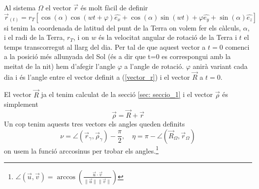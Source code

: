 \documentclass[11pt]{article}
\begin{document}
Al sistema $\Omega$ el vector $\vec{r}$ és molt fàcil de definir 
\begin{equation}
    \vec{r}_{(t)}=r_T[\cos(\alpha)\cos(wt+\varphi)\hat{e_x}+\cos(\alpha)\sin(wt)+\varphi\hat{e_y}+\sin(\alpha)\hat{e_z}]
    \label{vector_r}
\end{equation}
si tenim la coordenada de latitud del punt de la Terra on volem fer els càlculs, $\alpha$, i el radi de la Terra, $r_T$, i on $w$ és la velocitat angular de rotació de la Terra i $t$ el temps transcorregut al llarg del dia.
Per tal de que aquest vector a $t=0$ comenci a la posició més allunyada del Sol (és a dir que t=0 es correspongui amb la meitat de la nit) hem d'afegir l'angle $\varphi$ a l'angle de rotació. $\varphi$ anirà variant cada dia i és l'angle entre el vector definit a (\ref{vector_r}) i el vector $\vec{R}$ a $t=0$.

El vector $\vec{R}$ ja el tenim calculat de la secció \ref{sec: seccio_1} i el vector $\vec{\rho}$ és simplement
\begin{equation}
    \vec{\rho}= \vec{R}+\vec{r}
\end{equation}
Un cop tenim aquests tres vectors els angles queden definits
\begin{equation}
    \nu=\angle (\vec{r}_{\gamma}, \vec{\rho}_{\gamma}) -\frac{\pi}{2},  \quad
\eta=\pi - \angle (\vec{R}_{\Omega}, \vec{r}_{\Omega})
\end{equation}
on usem la funció arccosinus per trobar els angles.\footnote{$\angle (\vec{u}, \vec{v})= \arccos\left(\frac{\vec{u} \cdot \vec{v}}{\|\vec{u}\| \|\vec{v}\|}\right)$}
\end{document}
